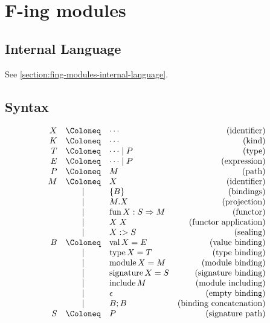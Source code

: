 \section{F-ing modules}

\cite{Rossberg:2014}

\subsection{Internal Language}

See \cref{section:fing-modules-internal-language}.

\subsection{Syntax}

\begin{align*}
  \begin{array}{rclr}
  X
  & \Coloneq & \cdots &(\text{identifier}) \\
  K
  & \Coloneq & \cdots &(\text{kind}) \\
  T
  & \Coloneq & \cdots \mid P &(\text{type}) \\
  E
  & \Coloneq & \cdots \mid P &(\text{expression}) \\
  P
  & \Coloneq & M &(\text{path}) \\
  M
  & \Coloneq & X &(\text{identifier}) \\
  & \mid & \{ B \} &(\text{bindings}) \\
  & \mid & M.X &(\text{projection}) \\
  & \mid & \symfun X: S \Rightarrow M &(\text{functor}) \\
  & \mid & X\; X &(\text{functor application}) \\
  & \mid & X :> S &(\text{sealing}) \\
  B
  & \Coloneq & \symval X = E &(\text{value binding}) \\
  & \mid & \symtype X = T &(\text{type binding}) \\
  & \mid & \symmodule X = M &(\text{module binding}) \\
  & \mid & \symsignature X = S &(\text{signature binding}) \\
  & \mid & \syminclude M &(\text{module including}) \\
  & \mid & \epsilon &(\text{empty binding}) \\
  & \mid & B; B &(\text{binding concatenation}) \\
  S
  & \Coloneq & P &(\text{signature path}) \\

\end{array}
\end{align*}
